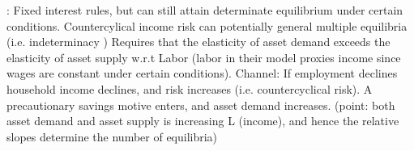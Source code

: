 \citet{auclert2018inequality}: Fixed interest rules, but can still attain determinate equilibrium under certain conditions. 
Countercylical income risk can potentially general multiple equilibria (i.e. indeterminacy )
Requires that the elasticity of asset demand exceeds the elasticity of asset supply w.r.t Labor (labor in their model proxies income since wages are constant under certain conditions).  
Channel: If employment declines household income declines, and risk increases (i.e. countercyclical risk). A precautionary savings motive enters, and asset demand increases. 
(point: both asset demand and asset supply is increasing L (income), and hence the relative slopes determine the number of equilibria)


 
 
 
 
 
 
 
 
 
 
